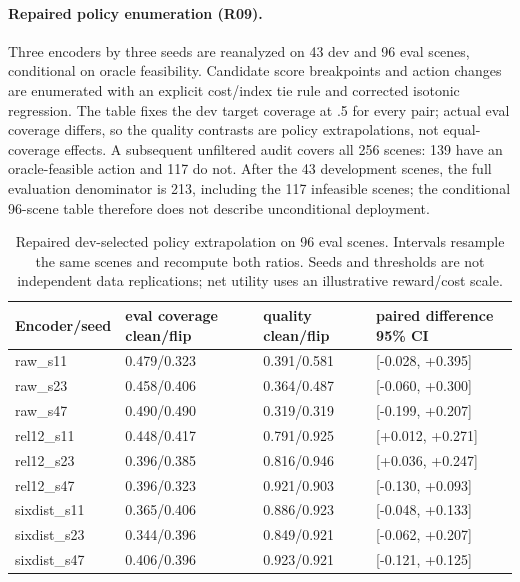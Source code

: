 \paragraph{Repaired policy enumeration (R09).} Three encoders by three seeds are reanalyzed on 43 dev and 96 eval scenes, conditional on oracle feasibility. Candidate score breakpoints and action changes are enumerated with an explicit cost/index tie rule and corrected isotonic regression. The table fixes the dev target coverage at .5 for every pair; actual eval coverage differs, so the quality contrasts are policy extrapolations, not equal-coverage effects. A subsequent unfiltered audit covers all 256 scenes: 139 have an oracle-feasible action and 117 do not. After the 43 development scenes, the full evaluation denominator is 213, including the 117 infeasible scenes; the conditional 96-scene table therefore does not describe unconditional deployment.
\begin{table}[t]\centering\small\begin{tabular}{@{}llll@{}}\toprule
Encoder/seed & eval coverage clean/flip & quality clean/flip & paired difference 95\% CI \\
\midrule
raw\_s11 & 0.479/0.323 & 0.391/0.581 & [-0.028, +0.395] \\
raw\_s23 & 0.458/0.406 & 0.364/0.487 & [-0.060, +0.300] \\
raw\_s47 & 0.490/0.490 & 0.319/0.319 & [-0.199, +0.207] \\
rel12\_s11 & 0.448/0.417 & 0.791/0.925 & [+0.012, +0.271] \\
rel12\_s23 & 0.396/0.385 & 0.816/0.946 & [+0.036, +0.247] \\
rel12\_s47 & 0.396/0.323 & 0.921/0.903 & [-0.130, +0.093] \\
sixdist\_s11 & 0.365/0.406 & 0.886/0.923 & [-0.048, +0.133] \\
sixdist\_s23 & 0.344/0.396 & 0.849/0.921 & [-0.062, +0.207] \\
sixdist\_s47 & 0.406/0.396 & 0.923/0.921 & [-0.121, +0.125] \\
\bottomrule\end{tabular}\caption{Repaired dev-selected policy extrapolation on 96 eval scenes. Intervals resample the same scenes and recompute both ratios. Seeds and thresholds are not independent data replications; net utility uses an illustrative reward/cost scale.}\end{table}
